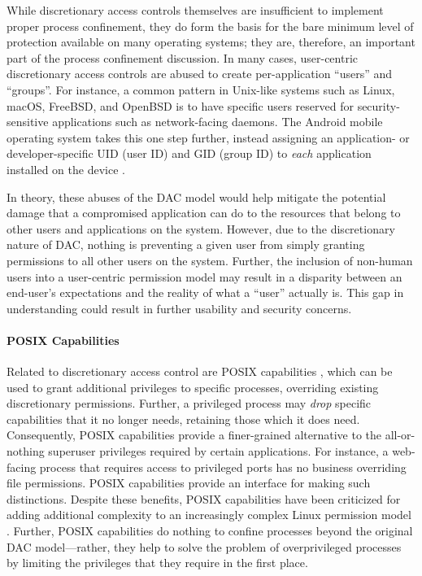 \documentclass[dvipsnames, 12pt]{article}
\begin{document}
While discretionary access controls themselves are insufficient to implement
proper process confinement, they do form the basis for the bare minimum level of
protection available on many operating systems; they are, therefore, an important
part of the process confinement discussion. In many cases, user-centric
discretionary access controls are abused to create per-application
\enquote{users} and \enquote{groups}. For instance, a common pattern in
Unix-like systems such as Linux, macOS, FreeBSD, and OpenBSD is to have specific
users reserved for security-sensitive applications such as network-facing
daemons. The Android mobile operating system takes this one step further,
instead assigning an application- or developer-specific UID (user ID) and GID
(group ID) to \textit{each} application installed on the device
\cite{android_security}.

In theory, these abuses of the DAC model would help mitigate the potential
damage that a compromised application can do to the resources that belong to
other users and applications on the system. However, due to the discretionary
nature of DAC, nothing is preventing a given user from simply granting
permissions to all other users on the system. Further, the inclusion of
non-human users into a user-centric permission model may result in a disparity
between an end-user's expectations and the reality of what a \enquote{user}
actually is. This gap in understanding could result in further usability and
security concerns.

\paragraph*{POSIX Capabilities}

Related to discretionary access control are POSIX capabilities
\cite{posix_capabilities,corbet2006_capabities_a,corbet2006_capabities_b}, which
can be used to grant additional privileges to specific processes, overriding
existing discretionary permissions. Further, a privileged process may
\textit{drop} specific capabilities that it no longer needs, retaining those
which it does need. Consequently, POSIX capabilities provide a finer-grained
alternative to the all-or-nothing superuser privileges required by certain
applications. For instance, a web-facing process that requires access to
privileged ports has no business overriding file permissions. POSIX capabilities
provide an interface for making such distinctions. Despite these benefits, POSIX
capabilities have been criticized for adding additional complexity to an
increasingly complex Linux permission model
\cite{corbet2006_capabities_b,corbet2006_capabities_a}.  Further, POSIX
capabilities do nothing to confine processes beyond the original DAC
model---rather, they help to solve the problem of overprivileged processes by
limiting the privileges that they require in the first place.
\end{document}
